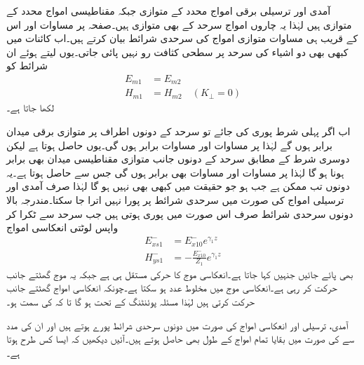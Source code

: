 آمدی اور ترسیلی برقی امواج  محدد کے متوازی جبکہ مقناطیسی امواج  محدد کے متوازی ہیں لہٰذا یہ چاروں امواج سرحد کے بھی متوازی ہیں۔صفحہ  پر مساوات  اور اس کے قریب ہی مساوات  متوازی امواج کی سرحدی شرائط بیان کرتے ہیں۔اب کائنات میں کبھی بھی دو اشیاء کی سرحد پر سطحی کثافت رو نہیں پائی جاتی۔یوں  لیتے ہوئے ان شرائط کو
\begin{align*}
E_{m1}&=E_{m2}\\
H_{m1}&=H_{m2} \quad(K_\perp=0)
\end{align*}
لکھا جاتا ہے۔

اب اگر پہلی شرط پوری کی جائے تو سرحد کے دونوں اطراف پر متوازی برقی میدان برابر ہوں گے  لہٰذا  پر مساوات  اور مساوات  برابر ہوں گی۔یوں  حاصل ہوتا ہے لیکن دوسری شرط کے مطابق سرحد کے دونوں جانب متوازی مقناطیسی میدان بھی برابر ہونا ہو گا لہٰذا  پر مساوات  اور مساوات  بھی برابر ہوں گی جس سے  حاصل ہوتا ہے۔یہ دونوں تب ممکن ہے جب  ہو جو حقیقت میں کبھی بھی نہیں ہو گا لہٰذا صرف آمدی اور ترسیلی امواج کی صورت میں سرحدی شرائط پر پورا نہیں اترا جا سکتا۔مندرجہ بالا دونوں سرحدی شرائط صرف اس صورت میں پوری ہوتی ہیں جب سرحد سے ٹکرا کر واپس لوٹتی انعکاسی امواج
\begin{align}
E_{xs1}^-&=E_{x10}^-e^{\gamma_1 z}\\
H_{ys1}^-&=-\frac{E_{x10}^-}{Z_1} e^{\gamma_1 z}
\end{align}
 بھی پائے جائیں جنہیں  کہا جاتا ہے۔انعکاسی موج کا  حرکی مستقل  ہی ہے جبکہ یہ موج  گھٹتے  جانب حرکت کر رہی ہے۔انعکاسی موج میں  مخلوط عدد ہو سکتا ہے۔چونکہ انعکاسی امواج گھٹتے  جانب حرکت کرتی ہیں لہٰذا مسئلہ پوئنٹنگ کے تحت  ہو گا تا کہ  کی سمت  ہو۔

آمدی، ترسیلی اور انعکاسی امواج کی صورت میں دونوں سرحدی شرائط پورے ہوتے ہیں اور ان کی مدد سے  کی صورت میں بقایا تمام امواج کے طول بھی حاصل ہوتے ہیں۔آئیں دیکھیں کہ ایسا کس طرح ہوتا ہے۔

